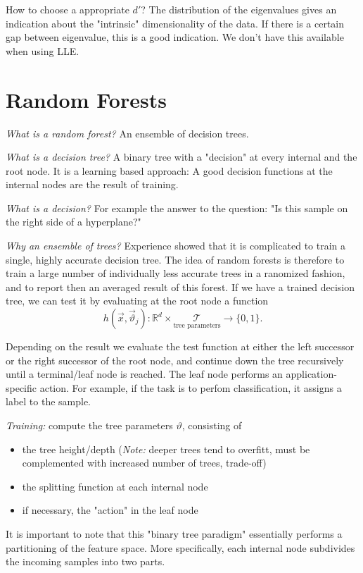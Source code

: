 \documentclass{scrartcl}
\begin{document}
How to choose a appropriate \(d'\)? The distribution of the eigenvalues gives an indication about the "intrinsic" dimensionality of the data. If there is a certain gap between eigenvalue, this is a good indication. We don't have this available when using LLE.
\section{Random Forests}
\textit{What is a random forest?} An ensemble of decision trees.

\textit{What is a decision tree?} A binary tree with a "decision" at every internal and the root node. It is a learning based approach: A good decision functions at the internal nodes are the result of training.

\textit{What is a decision?} For example the answer to the question: "Is this sample on the right side of a hyperplane?"

\textit{Why an ensemble of trees?} Experience showed that it is complicated to train a single, highly accurate decision tree. The idea of random forests is therefore to train a large number of individually less accurate trees in a ranomized fashion, and to report then an averaged result of this forest. 
If we have a trained decision tree, we can test it by evaluating at the root node a function
\[h(\vec{x}, \vec{\vartheta}_j): \mathbb{R}^d \times \underset{\text{tree parameters}}{\mathcal{T}} \rightarrow \{0, 1\}.\]

Depending on the result we evaluate the test function at either the left successor or the right successor of the root node, and continue down the tree recursively until a terminal/leaf node is reached.
The leaf node performs an application-specific action. For example, if the task is to perfom classification, it assigns a label to the sample.


\textit{Training:} compute the tree parameters \(\vartheta\), consisting of
\begin{itemize}
    \item
        the tree height/depth (\textit{Note:} deeper trees tend to overfitt, must be complemented with increased number of trees, trade-off)
    \item
        the splitting function at each internal node
    \item
        if necessary, the "action" in the leaf node
\end{itemize}

It is important to note that this "binary tree paradigm" essentially performs a partitioning of the feature space. More specifically, each internal node subdivides the incoming samples into two parts.
\end{document}

